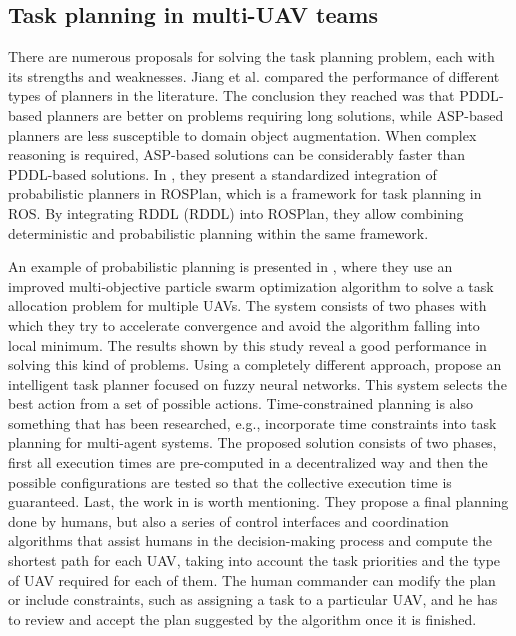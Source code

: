 \subsection{Task planning in multi-\gls{UAV} teams}
\label{subsec:TaskPlanning}
There are numerous proposals for solving the task planning problem, each with its strengths and weaknesses. Jiang et al. \cite{jiang2019task} compared the performance of different types of planners in the literature. The conclusion they reached was that \gls{PDDL}-based planners are better on problems requiring long solutions, while \gls{ASP}-based planners are less susceptible to domain object augmentation. When complex reasoning is required, \gls{ASP}-based solutions can be considerably faster than \gls{PDDL}-based solutions. In \cite{canal2019probabilistic}, they present a standardized integration of probabilistic planners in ROSPlan, which is a framework for task planning in \gls{ROS}. By integrating \acrshort{RDDL} (\acrlong{RDDL}) into ROSPlan, they allow combining deterministic and probabilistic planning within the same framework.

An example of probabilistic planning is presented in \cite{gao2018multi}, where they use an improved multi-objective particle swarm optimization algorithm to solve a task allocation problem for multiple \glspl{UAV}. The system consists of two phases with which they try to accelerate convergence and avoid the algorithm falling into local minimum. The results shown by this study reveal a good performance in solving this kind of problems. Using a completely different approach, \cite{jolly2010intelligent} propose an intelligent task planner focused on fuzzy neural networks. This system selects the best action from a set of possible actions. Time-constrained planning is also something that has been researched, e.g., \cite{nikou2016cooperative} incorporate time constraints into task planning for multi-agent systems. The proposed solution consists of two phases, first all execution times are pre-computed in a decentralized way and then the possible configurations are tested so that the collective execution time is guaranteed. Last, the work in  \cite{ramchurn2015study} is worth mentioning. They propose a final planning done by humans, but also a series of control interfaces and coordination algorithms that assist humans in the decision-making process and compute the shortest path for each \gls{UAV}, taking into account the task priorities and the type of \gls{UAV} required for each of them. The human commander can modify the plan or include constraints, such as assigning a task to a particular \gls{UAV}, and he has to  review and accept the plan suggested by the algorithm once it is finished.

